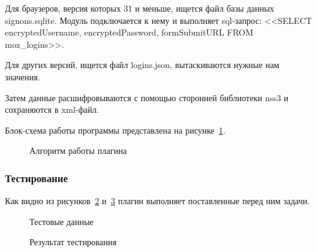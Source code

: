 Для браузеров, версия которых 31 и меньше, ищется файл базы данных signons.sqlite. Модуль подключается к нему и выполняет sql-запрос: <<SELECT encryptedUsername, encryptedPassword, formSubmitURL FROM moz\_logins>>.

Для других версий, ищется файл logins.json, вытаскиваются нужные нам значения.

Затем данные расшифровываются с помощью сторонней библиотеки nss3 и сохраняются в xml-файл.

Блок-схема работы программы представлена на рисунке~\ref{teresh_2:teresh_2}.

\begin{figure}[h!]
\caption{Алгоритм работы плагина}
\label{teresh_2:teresh_2}
\end{figure}

\subsubsection{Тестирование}

Как видно из рисунков~\ref{teresh_3:teresh_3} и~\ref{teresh_4:teresh_4} плагин выполняет поставленные перед ним задачи.

\begin{figure}[h!]
\caption{Тестовые данные}
\label{teresh_3:teresh_3}
\end{figure}

\clearpage
\begin{figure}[h!]
\caption{Результат тестирования}
\label{teresh_4:teresh_4}
\end{figure}

\clearpage
